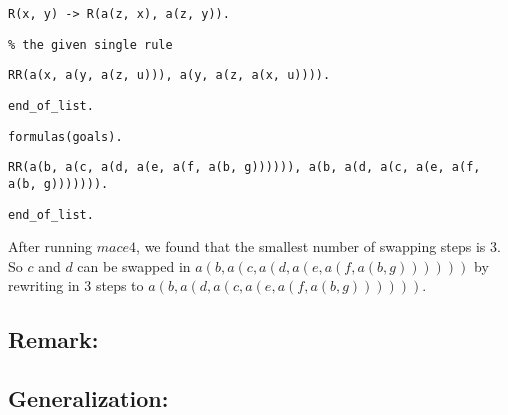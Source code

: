 \begin{description}
{{\tt R(x, y) -> R(a(z, x), a(z, y)).}

{\tt \% the given single rule}

{\tt RR(a(x, a(y, a(z, u))), a(y, a(z, a(x, u)))).}

{\tt end\_of\_list.}

{\tt formulas(goals).}

{\tt RR(a(b, a(c, a(d, a(e, a(f, a(b, g)))))), a(b, a(d, a(c, a(e, a(f, a(b, g))))))).}

{\tt end\_of\_list.  }

  }

  After running $mace4$, we found that the smallest number of swapping steps is 3. So $c$ and $d$ can be swapped in $a(b, a(c, a(d, a(e, a(f, a(b, g))))))$ by rewriting in 3 steps to $a(b, a(d, a(c, a(e, a(f, a(b, g))))))$.

\end{description}

\subsection*{Remark:}


\subsection*{Generalization:}




